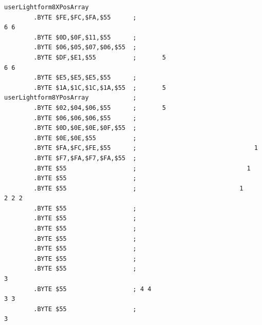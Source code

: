 \begin{lstlisting}[basicstyle=\ttfamily\tiny]
userLightform8XPosArray
        .BYTE $FE,$FC,$FA,$55      ;                                                            6 6
        .BYTE $0D,$0F,$11,$55      ;                                                               
        .BYTE $06,$05,$07,$06,$55  ;                                                               
        .BYTE $DF,$E1,$55          ;       5                                                    6 6
        .BYTE $E5,$E5,$E5,$55      ;                                                               
        .BYTE $1A,$1C,$1C,$1A,$55  ;       5                                                       
userLightform8YPosArray            ;                                                                   
        .BYTE $02,$04,$06,$55      ;       5                                                       
        .BYTE $06,$06,$06,$55      ;                                                               
        .BYTE $0D,$0E,$0E,$0F,$55  ;                                                               
        .BYTE $0E,$0E,$55          ;                                                               
        .BYTE $FA,$FC,$FE,$55      ;                                1                              
        .BYTE $F7,$FA,$F7,$FA,$55  ;                                                               
        .BYTE $55                  ;                              1                                
        .BYTE $55                  ;                                                               
        .BYTE $55                  ;                            1                  2 2 2           
        .BYTE $55                  ;                                                               
        .BYTE $55                  ;                                                               
        .BYTE $55                  ;                                                               
        .BYTE $55                  ;                                                               
        .BYTE $55                  ;                                                               
        .BYTE $55                  ;                                                               
        .BYTE $55                  ;                                        3                      
        .BYTE $55                  ; 4 4                                   3 3                     
        .BYTE $55                  ;                                        3                      
\end{lstlisting}


